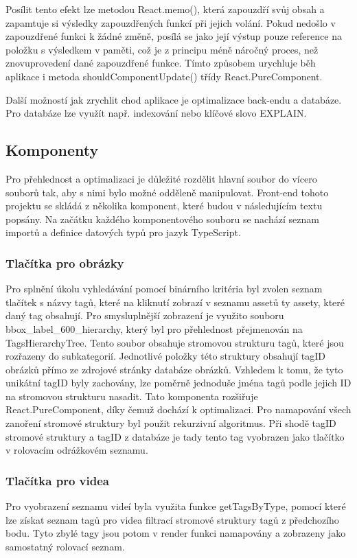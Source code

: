 Posílit tento efekt lze metodou React.memo(), která zapouzdří svůj obsah a zapamtuje si výsledky zapouzdřených funkcí při jejich volání. Pokud nedošlo v zapouzdřené funkci k žádné změně, posílá se jako její výstup pouze reference na položku s výsledkem v paměti, což je z principu méně náročný proces, než znovuprovedení dané zapouzdřené funkce. Tímto způsobem urychluje běh aplikace i metoda shouldComponentUpdate() třídy React.PureComponent.

Další možností jak zrychlit chod aplikace je optimalizace back-endu a databáze. Pro databáze lze využít např. indexování nebo klíčové slovo EXPLAIN.

\subsection{Komponenty}
Pro přehlednost a optimalizaci je důležité rozdělit hlavní soubor do vícero souborů tak, aby s nimi bylo možné odděleně manipulovat. Front-end tohoto projektu se skládá z několika komponent, které budou v následujícím textu popsány. Na začátku každého komponentového souboru se nachází seznam importů a definice datových typů pro jazyk TypeScript.

\subsubsection{Tlačítka pro obrázky}
Pro splnění úkolu vyhledávání pomocí binárního kritéria byl zvolen seznam tlačítek s názvy tagů, které na kliknutí zobrazí v seznamu assetů ty assety, které daný tag obsahují. Pro smysluplnější zobrazení je využito souboru bbox\_label\_600\_hierarchy, který byl pro přehlednost přejmenován na TagsHierarchyTree. Tento soubor obsahuje stromovou strukturu tagů, které jsou rozřazeny do subkategorií. Jednotlivé položky této struktury obsahují tagID obrázků přímo ze zdrojové stránky databáze obrázků. Vzhledem k tomu, že tyto unikátní tagID byly zachovány, lze poměrně jednoduše jména tagů podle jejich ID na stromovou strukturu nasadit. Tato komponenta rozšiřuje React.PureComponent, díky čemuž dochází k optimalizaci. Pro namapování všech zanoření stromové struktury byl použit rekurzivní algoritmus. Při shodě tagID stromové struktury a tagID z databáze je tady tento tag vyobrazen jako tlačítko v rolovacím odrážkovém seznamu.

\subsubsection{Tlačítka pro videa}
Pro vyobrazení seznamu videí byla využita funkce getTagsByType, pomocí které lze získat seznam tagů pro videa filtrací stromové struktury tagů z předchozího bodu. Tyto zbylé tagy jsou potom v render funkci namapovány a zobrazeny jako samostatný rolovací seznam.

